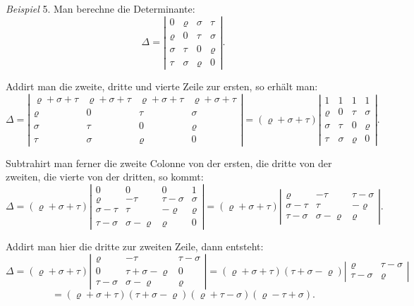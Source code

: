 \textit{Beispiel} 5. Man berechne die Determinante:
\[
\Delta =
\left|
\begin{array}{cccc}
0 & \varrho & \sigma & \tau \\
\varrho & 0 & \tau & \sigma \\
\sigma & \tau & 0 & \varrho \\
\tau & \sigma & \varrho & 0
\end{array}
\right|.
\]

Addirt man die zweite, dritte und vierte Zeile zur ersten, so erhält man:
\[
\Delta =
\left|
\begin{array}{cccc}
\varrho+\sigma+\tau & \varrho+\sigma+\tau & \varrho+\sigma+\tau & \varrho+\sigma+\tau \\
\varrho & 0 & \tau & \sigma \\
\sigma & \tau & 0 & \varrho \\
\tau & \sigma & \varrho & 0
\end{array}
\right|
= (\varrho+\sigma+\tau)
\left|
\begin{array}{cccc}
1 & 1 & 1 & 1 \\
\varrho & 0 & \tau & \sigma \\
\sigma & \tau & 0 & \varrho \\
\tau & \sigma & \varrho & 0
\end{array}
\right|.
\]

Subtrahirt man ferner die zweite Colonne von der ersten, die dritte von der zweiten, die vierte von der dritten, so kommt:
\[
\Delta = (\varrho+\sigma+\tau)
\left|
\begin{array}{cccc}
0 & 0 & 0 & 1 \\
\varrho & -\tau & \tau-\sigma & \sigma \\
\sigma-\tau & \tau & -\varrho & \varrho \\
\tau-\sigma & \sigma-\varrho & \varrho & 0
\end{array}
\right|
= (\varrho+\sigma+\tau)
\left|
\begin{array}{ccc}
\varrho & -\tau & \tau-\sigma \\
\sigma-\tau & \tau & -\varrho \\
\tau-\sigma & \sigma-\varrho & \varrho
\end{array}
\right|.
\]

Addirt man hier die dritte zur zweiten Zeile, dann entsteht:
\[
\Delta = (\varrho+\sigma+\tau)
\left|
\begin{array}{ccc}
\varrho & -\tau & \tau-\sigma \\
0 & \tau+\sigma-\varrho & 0 \\
\tau-\sigma & \sigma-\varrho & \varrho
\end{array}
\right|
= (\varrho+\sigma+\tau)(\tau+\sigma-\varrho)
\left|
\begin{array}{cc}
\varrho & \tau-\sigma \\
\tau-\sigma & \varrho
\end{array}
\right|
\]
\[
= (\varrho+\sigma+\tau)(\tau+\sigma-\varrho)(\varrho+\tau-\sigma)(\varrho-\tau+\sigma).
\]

